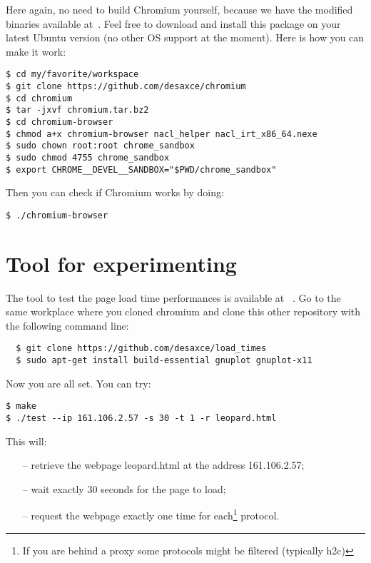 \documentclass[12pt, notitlepage]{article}
\begin{document}
\newpage
Here again, no need to build Chromium yourself, because we have the
modified binaries available at~\cite{chromium}. Feel free to download and
install this package on your latest Ubuntu version (no other OS support at 
the moment). Here is how you can make it work:
\begin{lstlisting}
$ cd my/favorite/workspace 
$ git clone https://github.com/desaxce/chromium 
$ cd chromium 
$ tar -jxvf chromium.tar.bz2 
$ cd chromium-browser 
$ chmod a+x chromium-browser nacl_helper nacl_irt_x86_64.nexe 
$ sudo chown root:root chrome_sandbox 
$ sudo chmod 4755 chrome_sandbox 
$ export CHROME__DEVEL__SANDBOX="$PWD/chrome_sandbox"
\end{lstlisting}

Then you can check if Chromium works by doing: 
\begin{lstlisting}
$ ./chromium-browser
\end{lstlisting}

\section{Tool for experimenting}
The tool to test the page load time performances is available at
~\cite{load_times}. Go to the same workplace where you cloned chromium
and clone this other repository with the following command line: 
\begin{lstlisting}
  $ git clone https://github.com/desaxce/load_times
  $ sudo apt-get install build-essential gnuplot gnuplot-x11
\end{lstlisting}
\vspace*{0.5cm}

Now you are all set. You can try: 
\begin{lstlisting}
$ make
$ ./test --ip 161.106.2.57 -s 30 -t 1 -r leopard.html
\end{lstlisting}

\vspace*{0.5cm}
This will: 
\begin{itemize}[noitemsep]
\item[--] retrieve the webpage leopard.html at the address 
161.106.2.57;
\item[--] wait exactly 30 seconds for the page to load;
\item[--] request the webpage exactly one time for each\footnote{If you are
behind a proxy some protocols might be filtered (typically h2c)}
protocol.
\end{itemize}
\end{document}
